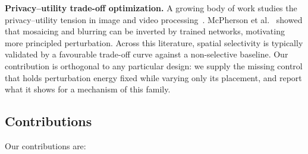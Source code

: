 \documentclass[10pt,journal]{IEEEtran}
\begin{document}
\textbf{Privacy--utility trade-off optimization.}
A growing body of work studies the privacy--utility tension in image and video processing~\cite{wu2018towards}. McPherson et al.~\cite{mcpherson2016defeating} showed that mosaicing and blurring can be inverted by trained networks, motivating more principled perturbation. Across this literature, spatial selectivity is typically validated by a favourable trade-off curve against a non-selective baseline. Our contribution is orthogonal to any particular design: we supply the missing control that holds perturbation energy fixed while varying only its placement, and report what it shows for a mechanism of this family.


\subsection{Contributions}
Our contributions are:
\end{document}

